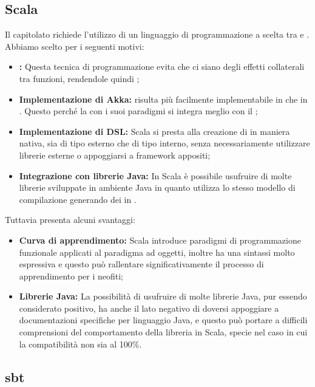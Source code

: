\documentclass{scalatekids-article}
\begin{document}
\subsection{Scala}

Il capitolato richiede l'utilizzo di un linguaggio di programmazione a scelta
tra  e . Abbiamo scelto  per i seguenti
motivi:

\begin{itemize}
\item\textbf{:} Questa tecnica di
  programmazione evita che ci siano degli effetti collaterali tra funzioni,
  rendendole quindi ;
\item\textbf{Implementazione di Akka:}  risulta più
  facilmente implementabile in  che in . Questo perché
  la  con i suoi paradigmi si integra meglio
  con il ;
\item\textbf{Implementazione di DSL:} Scala si presta alla creazione di 
  in maniera nativa, sia di tipo esterno che di tipo interno, senza necessariamente
  utilizzare librerie esterne o appoggiarsi a framework appositi;
\item\textbf{Integrazione con librerie Java:} In Scala è possibile usufruire di molte
  librerie sviluppate in ambiente Java in quanto utilizza lo stesso modello di compilazione
  generando dei  in .
\end{itemize}

Tuttavia presenta alcuni svantaggi:

\begin{itemize}
\item\textbf{Curva di apprendimento:} Scala introduce paradigmi di programmazione funzionale
  applicati al paradigma ad oggetti, inoltre ha una sintassi molto espressiva e questo può
  rallentare significativamente il processo di apprendimento per i neofiti;
\item\textbf{Librerie Java:} La possibilità di usufruire di molte librerie Java, pur essendo
  considerato positivo, ha anche il lato negativo di doversi appoggiare a documentazioni specifiche
  per linguaggio Java, e questo può portare a difficili comprensioni del comportamento della libreria
  in Scala, specie nel caso in cui la compatibilità non sia al 100\%.
\end{itemize}

\subsection{sbt}
\end{document}
